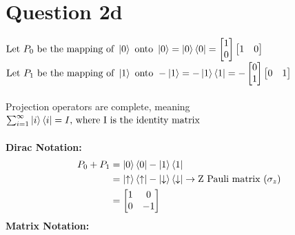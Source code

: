 \documentclass{article}
\begin{document}
\section*{Question 2d}
$\text{Let } P_0 \text{ be the mapping of } \ket{0} \text{ onto } \ket{0} = \ket{0}\bra{0} = \begin{bmatrix} 1 \\ 0 \end{bmatrix} \begin{bmatrix} 1 & 0 \end{bmatrix}$ \\
$\text{Let } P_1\text{ be the mapping of } \ket{1} \text{ onto } -\ket{1} = -\ket{1}\bra{1} = -\begin{bmatrix} 0 \\ 1 \end{bmatrix} \begin{bmatrix} 0 & 1 \end{bmatrix}$ \\\\
Projection operators are complete, meaning $\sum_{i = 1}^{\infty} \ket{i}\bra{i} = I \text{, where I is the identity matrix}$ \\\\
\textbf{Dirac Notation:}
\begin{align*}
    \begin{split}
        P_0 + P_1 &= \ket{0}\bra{0} - \ket{1}\bra{1} \\
        &= \ket{\uparrow}\bra{\uparrow} - \ket{\downarrow}\bra{\downarrow} \rightarrow \text{Z Pauli matrix } (\sigma_z)\\
        &= \begin{bmatrix}
            1 & 0 \\
            0 & -1
        \end{bmatrix}\\
    \end{split}
\end{align*}
\textbf{Matrix Notation:}
\end{document}
